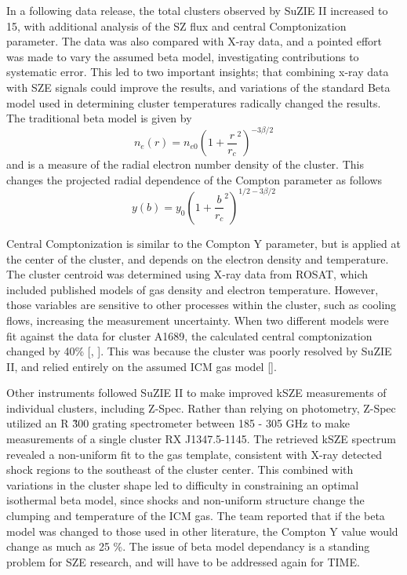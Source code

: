\documentclass[manuscript]{aastex}
\begin{document}
In a following data release, the total clusters observed by SuZIE II increased to 15, with additional analysis of the SZ flux and central Comptonization parameter. The data was also compared with X-ray data, and a pointed effort was made to vary the assumed beta model, investigating contributions to systematic error. This led to two important insights; that combining x-ray data with SZE signals could improve the results, and variations of the standard Beta model used in determining cluster temperatures radically changed the results. The traditional beta model is given by 
\begin{equation}
    n_{e}(r) = n_{e0}(1 + \frac{r}{r_{c}}^{2})^{-3\beta/2}
\end{equation}
and is a measure of the radial electron number density of the cluster. This changes the projected radial dependence of the Compton parameter as follows
\begin{equation}
    y(b) = y_{0}(1 + \frac{b}{r_{c}}^{2})^{1/2 - 3\beta/2}
\end{equation}

Central Comptonization is similar to the Compton Y parameter, but is applied at the center of the cluster, and depends on the electron density and temperature. The cluster centroid was determined using X-ray data from ROSAT, which included published models of gas density and electron temperature. However, those variables are sensitive to other processes within the cluster, such as cooling flows, increasing the measurement uncertainty. When two different models were fit against the data for cluster A1689, the calculated central comptonization changed by 40\% [\cite{Holzapfel1997b}, \cite{Reese2002}]. This was because the cluster was poorly resolved by SuZIE II, and relied entirely on the assumed ICM gas model [\cite{Benson2004}]. 

Other instruments followed SuZIE II to make improved kSZE measurements of individual clusters, including Z-Spec. Rather than relying on photometry, Z-Spec utilized an R \~ 300 grating spectrometer between 185 - 305 GHz to make measurements of a single cluster RX J1347.5-1145. The retrieved kSZE spectrum revealed a non-uniform fit to the gas template, consistent with X-ray detected shock regions to the southeast of the cluster center. This combined with variations in the cluster shape led to difficulty in constraining an optimal isothermal beta model, since shocks and non-uniform structure change the clumping and temperature of the ICM gas. The team reported that if the beta model was changed to those used in other literature, the Compton Y value would change as much as 25 \%. The issue of beta model dependancy is a standing problem for SZE research, and will have to be addressed again for TIME.
\end{document}
